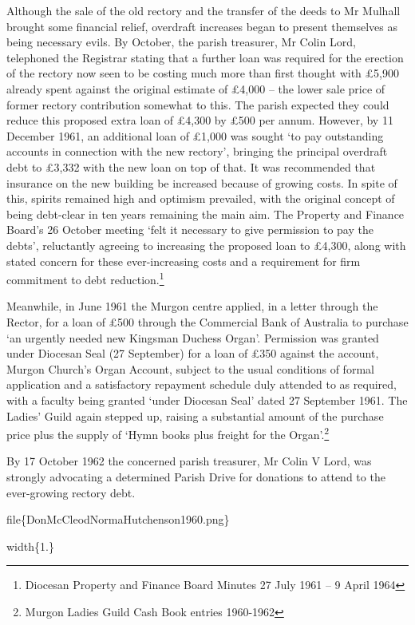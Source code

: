 Although the sale of the old rectory and the transfer of the deeds to Mr Mulhall brought some financial relief, overdraft increases began to present themselves as being necessary evils. By October, the parish treasurer, Mr Colin Lord, telephoned the Registrar stating that a further loan was required for the erection of the rectory now seen to be costing much more than first thought with £5,900 already spent against the original estimate of £4,000 -- the lower sale price of former rectory contribution somewhat to this. The parish expected they could reduce this proposed extra loan of £4,300 by £500 per annum. However, by 11 December 1961, an additional loan of £1,000 was sought `to pay outstanding accounts in connection with the new rectory', bringing the principal overdraft debt to £3,332 with the new loan on top of that. It was recommended that insurance on the new building be increased because of growing costs. In spite of this, spirits remained high and optimism prevailed, with the original concept of being debt-clear in ten years remaining the main aim. The Property and Finance Board's 26 October meeting `felt it necessary to give permission to pay the debts', reluctantly agreeing to increasing the proposed loan to £4,300, along with stated concern for these ever-increasing costs and a requirement for firm commitment to debt reduction.\footnote{Diocesan Property and Finance Board Minutes 27 July 1961 -- 9 April 1964}

Meanwhile, in June 1961 the Murgon centre applied, in a letter through the Rector, for a loan of £500 through the Commercial Bank of Australia to purchase `an urgently needed new Kingsman Duchess Organ'. Permission was granted under Diocesan Seal (27 September) for a loan of £350 against the account, Murgon Church's Organ Account, subject to the usual conditions of formal application and a satisfactory repayment schedule duly attended to as required, with a faculty being granted `under Diocesan Seal' dated 27 September 1961. The Ladies' Guild again stepped up, raising a substantial amount of the purchase price plus the supply of `Hymn books plus freight for the Organ'.\footnote{Murgon Ladies Guild Cash Book entries 1960-1962}

By 17 October 1962 the concerned parish treasurer, Mr Colin V Lord, was strongly advocating a determined Parish Drive for donations to attend to the ever-growing rectory debt.

file\{DonMcCleodNormaHutchenson1960.png\}

width\{1.\}

